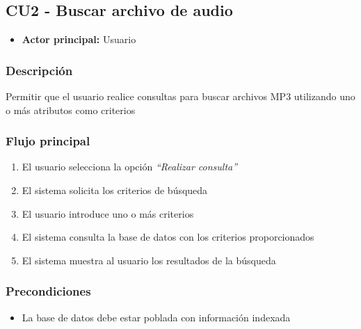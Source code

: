 \bigskip

\subsection*{CU2 - Buscar archivo de audio}
\begin{itemize}
  \item \textbf{Actor principal:} Usuario
\end{itemize}

\subsubsection*{Descripción}
Permitir que el usuario realice consultas para buscar archivos MP3 utilizando uno o más
atributos como criterios

\subsubsection*{Flujo principal}
\begin{enumerate}
  \item El usuario selecciona la opción \textit{\textquotedblleft Realizar consulta\textquotedblright}
  \item El sistema solicita los criterios de búsqueda
  \item El usuario introduce uno o más criterios
  \item El sistema consulta la base de datos con los criterios proporcionados
  \item El sistema muestra al usuario los resultados de la búsqueda
\end{enumerate}

\subsubsection*{Precondiciones}
\begin{itemize}
  \item La base de datos debe estar poblada con información indexada
\end{itemize}

